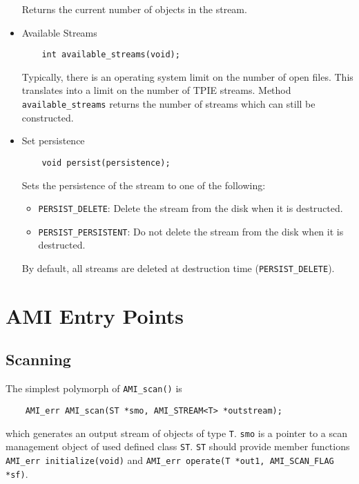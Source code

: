 \begin{itemize}
Returns the current number of objects in the stream.

\item{Available Streams}
\begin{verbatim}
    int available_streams(void);    
\end{verbatim}

Typically, there is an operating system limit on the number
of open files. This translates into a limit on the number of
TPIE streams. Method \verb|available_streams| returns the
number of streams which can still be constructed.

\item{Set persistence}

\begin{verbatim}
    void persist(persistence);
\end{verbatim}

Sets the persistence of the stream to one of the following:
\begin{itemize}
\item \verb|PERSIST_DELETE|: Delete the stream from the disk when it is
  destructed.
\item \verb|PERSIST_PERSISTENT|: Do not delete the stream from the disk when
  it is destructed.
\end{itemize}

By default, all streams are deleted at destruction time
(\verb|PERSIST_DELETE|).
\end{itemize}



\section{AMI Entry Points}


\subsection{Scanning}
\label{sec:ref-ami-scan}


The simplest polymorph of \verb|AMI_scan()| is
\begin{verbatim}
    AMI_err AMI_scan(ST *smo, AMI_STREAM<T> *outstream);
\end{verbatim}
which generates an output stream of objects of type \verb|T|.
\verb|smo| is a pointer to a scan management object of used defined
class \verb|ST|.  \verb|ST| should provide member functions {\tt
  AMI\_err initialize(void)} and {\tt AMI\_err operate(T *out1,
  AMI\_SCAN\_FLAG *sf)}.

